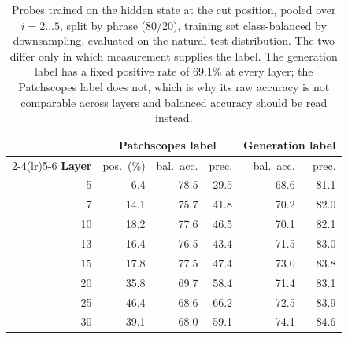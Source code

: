 \begin{table}[t]
\centering\small
\begin{tabular}{rrrrrr}
\toprule
& \multicolumn{3}{c}{\textbf{Patchscopes label}} & \multicolumn{2}{c}{\textbf{Generation label}} \\
\cmidrule(lr){2-4}\cmidrule(lr){5-6}
\textbf{Layer} & pos.\ (\%) & bal.\ acc. & prec. & bal.\ acc. & prec. \\
\midrule
5 & 6.4 & 78.5 & 29.5 & 68.6 & 81.1 \\
7 & 14.1 & 75.7 & 41.8 & 70.2 & 82.0 \\
10 & 18.2 & 77.6 & 46.5 & 70.1 & 82.1 \\
13 & 16.4 & 76.5 & 43.4 & 71.5 & 83.0 \\
15 & 17.8 & 77.5 & 47.4 & 73.0 & 83.8 \\
20 & 35.8 & 69.7 & 58.4 & 71.4 & 83.1 \\
25 & 46.4 & 68.6 & 66.2 & 72.5 & 83.9 \\
30 & 39.1 & 68.0 & 59.1 & 74.1 & 84.6 \\
\bottomrule
\end{tabular}
\caption{Probes trained on the hidden state at the cut position, pooled over
$i=2\ldots5$, split by phrase (80/20), training set class-balanced by
downsampling, evaluated on the natural test distribution. The two differ only in
which measurement supplies the label. The generation label has a fixed positive
rate of 69.1\% at every layer; the Patchscopes label does not,
which is why its raw accuracy is not comparable across layers and balanced
accuracy should be read instead.}
\label{tab:probes}
\end{table}
